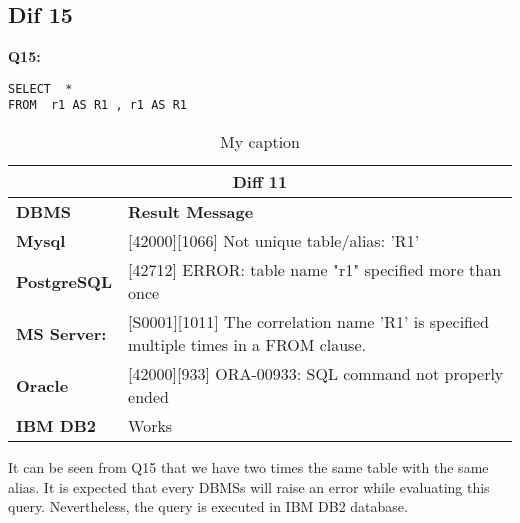 \subsection{Dif 15}

\begin{mdframed}[backgroundcolor=gray!20] 
\textbf{Q15:}
\begin{lstlisting}
SELECT  *
FROM  r1 AS R1 , r1 AS R1
\end{lstlisting}
\end{mdframed} 

\begin{table}[h]
\centering
\caption{My caption}
\label{my-label}
\begin{tabular}{|p{2cm}|p{12cm}|}
\hline
\multicolumn{2}{|c|}{\textbf{Diff 11}}                                                                                                                            \\ \hline
\textbf{DBMS}                              & \textbf{Result Message}                                                                                              \\ \hline
{\color[HTML]{333333} \textbf{Mysql}}      & {\color[HTML]{333333} {[}42000{]}{[}1066{]} Not unique table/alias: 'R1'}                                            \\ \hline
{\color[HTML]{333333} \textbf{PostgreSQL}} & {\color[HTML]{333333} {[}42712{]} ERROR: table name "r1" specified more than once}                                   \\ \hline
{\color[HTML]{333333} \textbf{MS Server:}} & {\color[HTML]{333333} {[}S0001{]}{[}1011{]} The correlation name 'R1' is specified multiple times in a FROM clause.} \\ \hline
\textbf{Oracle}                            & {[}42000{]}{[}933{]} ORA-00933: SQL command not properly ended                                                       \\ \hline
\textbf{IBM DB2}                           & Works                                                                                                                \\ \hline
\end{tabular}
\end{table}

It can be seen from Q15 that we have two times the same table with the same alias. It is expected that every DBMSs will raise an error while evaluating this query. Nevertheless, the query is executed in IBM DB2 database. 

